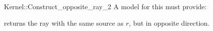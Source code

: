 \begin{ccRefFunctionObjectConcept}{Kernel::Construct_opposite_ray_2}
A model for this must provide:


{returns the ray with the same source as $r$, but in opposite direction.}

\end{ccRefFunctionObjectConcept}
